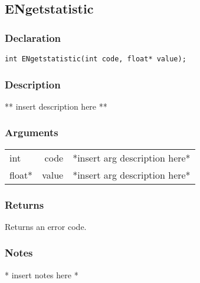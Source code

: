 \subsection{ENgetstatistic}
\subsubsection{Declaration}
\begin{lstlisting}
int ENgetstatistic(int code, float* value);
\end{lstlisting}
\subsubsection{Description}
** insert description here **
\subsubsection{Arguments}
\begin{tabular}{l r p{11cm} }
int&code&*insert arg description here* \\[6pt]
float*&value&*insert arg description here* \\[6pt]
\end{tabular}
\subsubsection{Returns}
Returns an error code.
\subsubsection{Notes}
* insert notes here *